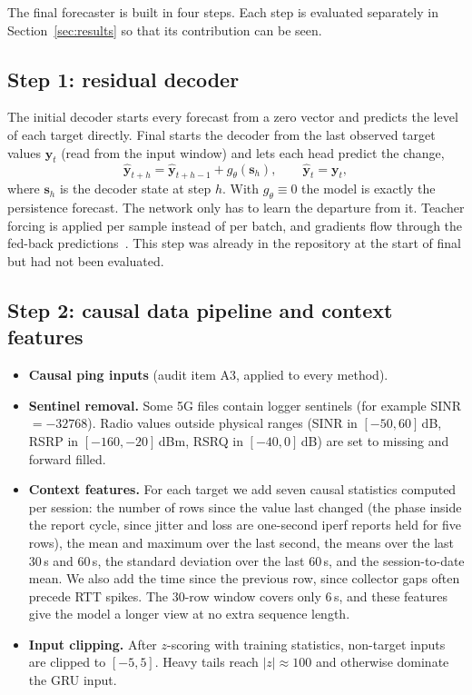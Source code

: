 The final forecaster is built in four steps. Each step is evaluated separately in Section~\ref{sec:results} so that its contribution can be seen.

\subsection{Step 1: residual decoder}
The initial decoder starts every forecast from a zero vector and predicts the level of each target directly. Final starts the decoder from the last observed target values $\mathbf{y}_t$ (read from the input window) and lets each head predict the change,
\begin{equation}
\hat{\mathbf{y}}_{t+h} = \hat{\mathbf{y}}_{t+h-1} + g_\theta(\mathbf{s}_h), \qquad \hat{\mathbf{y}}_{t} = \mathbf{y}_t ,
\label{eq:resid}
\end{equation}
where $\mathbf{s}_h$ is the decoder state at step $h$. With $g_\theta\equiv 0$ the model is exactly the persistence forecast. The network only has to learn the departure from it. Teacher forcing is applied per sample instead of per batch, and gradients flow through the fed-back predictions~\cite{bengio2015scheduled}. This step was already in the repository at the start of final but had not been evaluated.

\subsection{Step 2: causal data pipeline and context features}
\begin{itemize}[leftmargin=*]
  \item \textbf{Causal ping inputs} (audit item A3, applied to every method).
  \item \textbf{Sentinel removal.} Some 5G files contain logger sentinels (for example SINR $=-32768$). Radio values outside physical ranges (SINR in $[-50,60]$\,dB, RSRP in $[-160,-20]$\,dBm, RSRQ in $[-40,0]$\,dB) are set to missing and forward filled.
  \item \textbf{Context features.} For each target we add seven causal statistics computed per session: the number of rows since the value last changed (the phase inside the report cycle, since jitter and loss are one-second iperf reports held for five rows), the mean and maximum over the last second, the means over the last 30\,s and 60\,s, the standard deviation over the last 60\,s, and the session-to-date mean. We also add the time since the previous row, since collector gaps often precede RTT spikes. The 30-row window covers only 6\,s, and these features give the model a longer view at no extra sequence length.
  \item \textbf{Input clipping.} After $z$-scoring with training statistics, non-target inputs are clipped to $[-5,5]$. Heavy tails reach $|z|\approx 100$ and otherwise dominate the GRU input.
\end{itemize}

